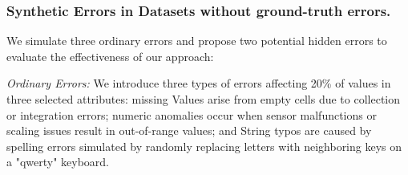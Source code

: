 

\vspace*{-0.2cm}
\subsubsection{Synthetic Errors in Datasets without ground-truth errors.}

We simulate three ordinary errors and propose two potential hidden errors to evaluate the effectiveness of our approach:


\textit{Ordinary Errors:} We introduce three types of errors affecting 20\% of values in three selected attributes: missing Values arise from empty cells due to collection or integration errors; numeric anomalies occur when sensor malfunctions or scaling issues result in out-of-range values; and String typos are caused by spelling errors simulated by randomly replacing letters with neighboring keys on a "qwerty" keyboard.


